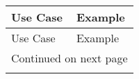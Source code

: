 \begin{longtable}{p{} p{}}
\toprule
      Use Case &                                                                                                                                                                                                                                                                                        Example \\ \midrule
\midrule
\endfirsthead

\toprule
      Use Case &                                                                                                                                                                                                                                                                                        Example \\ \midrule
\midrule
\endhead
\midrule
\multicolumn{2}{r}{{Continued on next page}} \\ \midrule
\midrule
\endfoot


\end{longtable}
